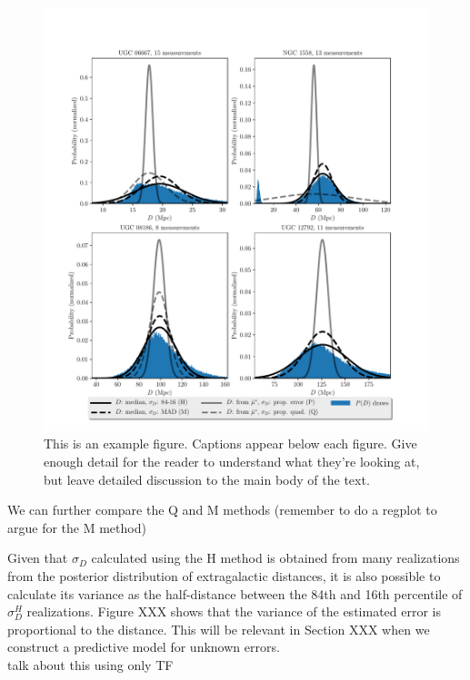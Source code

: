 \documentclass[a4paper,fleqn,usenatbib]{mnras}
\begin{document}
\begin{figure}
	\includegraphics[scale=0.7]{comp}
    \caption{This is an example figure. Captions appear below each figure.
	Give enough detail for the reader to understand what they're looking at,
	but leave detailed discussion to the main body of the text.}
    \label{fig:comp}
\end{figure}
We can further compare the Q and M methods (remember to do a regplot to argue for the M method)

Given that $\sigma_D$ calculated using the H method is obtained from many realizations from the posterior distribution of extragalactic distances, it is also possible to calculate its variance as the half-distance between the 84th and 16th percentile of $\sigma_D^H$ realizations. Figure XXX shows that the variance of the estimated error is proportional to the distance. This will be relevant in Section XXX when we construct a predictive model for unknown errors.\\

talk about this using only TF
\end{document}
